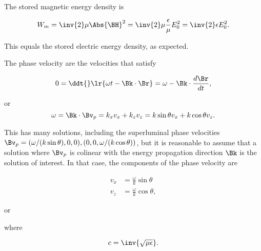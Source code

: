 {

The stored magnetic energy density is

\begin{dmath}\label{eqn:emtproblemSet6Problem3:280}
W_m 
= \inv{2} \mu \Abs{\BH}^2
= \inv{2} \mu \frac{\epsilon}{\mu} E_0^2
= \inv{2} \epsilon E_0^2.
\end{dmath}

This equals the stored electric energy density, as expected.


The phase velocity are the velocities that satisfy

\begin{dmath}\label{eqn:emtproblemSet6Problem3:300}
0 
= 
\ddt{} \lr{ \omega t - \Bk \cdot \Br }
= 
\omega - \Bk \cdot \frac{d\Br}{dt},
\end{dmath}

or
\begin{dmath}\label{eqn:emtproblemSet6Problem3:380}
\omega = 
\Bk \cdot \Bv_p
=
k_x v_x
+
k_z v_z
=
k \sin\theta v_x
+
k \cos\theta v_z.
\end{dmath}

This has many solutions, including the superluminal phase velocities \( \Bv_p = (\omega/(k\sin\theta), 0, 0), (0, 0, \omega/(k\cos\theta)) \), but it is reasonable to assume that a solution where \( \Bv_p \) is colinear with the energy propagation direction \( \Bk \) is the solution of interest.  In that case, the components of the phase velocity are

\begin{dmath}\label{eqn:emtproblemSet6Problem3:320}
\begin{aligned}
v_x &= \frac{\omega}{k}\sin\theta \\
v_z &= \frac{\omega}{k}\cos\theta,
\end{aligned}
\end{dmath}

or


where 

\begin{dmath}\label{eqn:emtproblemSet6Problem3:360}
c = \inv{\sqrt{\mu \epsilon}}.
\end{dmath}

}
